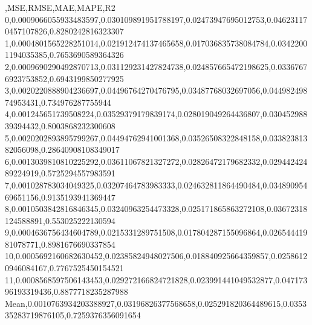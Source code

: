 ,MSE,RMSE,MAE,MAPE,R2
0,0.0009066055933483597,0.030109891951788197,0.02473947695012753,0.046231170457107826,0.8280242816323307
1,0.0004801565228251014,0.021912474137465658,0.017036835738084784,0.03422001194035385,0.7653690589364326
2,0.0009690290492870713,0.031129231427824738,0.024857665472198625,0.03367676923753852,0.6943199850277925
3,0.0020220888904236697,0.04496764270476795,0.03487768032697056,0.04498249874953431,0.734976287755944
4,0.001245651739508224,0.03529379179839174,0.028019049264436807,0.03045298839394432,0.8003868232300608
5,0.0020202893895799267,0.04494762941001368,0.03526508322848158,0.03382381382056098,0.28640908108349017
6,0.0013039810810225292,0.03611067821327272,0.02826472179682332,0.02944242489224919,0.5725294557983591
7,0.001028783034049325,0.03207464783983333,0.024632811864490484,0.03489095469651156,0.9135193941369447
8,0.0010503842816846345,0.03240963254473328,0.025171865863272108,0.03672318124588891,0.553025222130594
9,0.0004636756434604789,0.0215331289751508,0.017804287155096864,0.02654441981078771,0.8981676690337854
10,0.0005692160682630452,0.02385824948027506,0.018840925664359857,0.02586120946084167,0.7767525450154521
11,0.0008568597506143453,0.029272166824721828,0.023991441049532877,0.04717396193319436,0.8877718235287988
Mean,0.0010763934203388927,0.03196826377568658,0.025291820364489615,0.035335283719876105,0.7259376356091654
